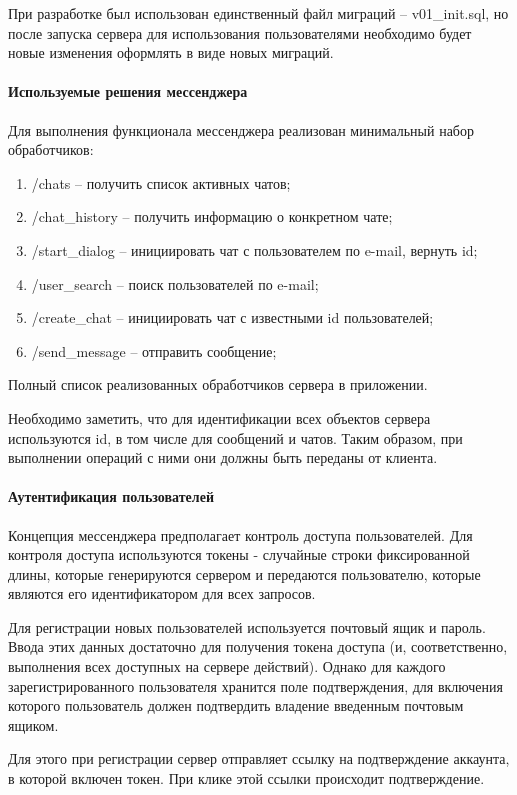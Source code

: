 \documentclass[explnote]{espd}
\begin{document}
При разработке был использован единственный файл миграций -- v01\_init.sql, но после запуска сервера для использования пользователями необходимо будет новые изменения оформлять в виде новых миграций.

\paragraph{Используемые решения мессенджера}
Для выполнения функционала мессенджера реализован минимальный набор обработчиков:

\begin{enumerate}
\item /chats -- получить список активных чатов;
\item /chat\_history -- получить информацию о конкретном чате;
\item /start\_dialog -- инициировать чат с пользователем по e-mail, вернуть id;
\item /user\_search -- поиск пользователей по e-mail;
\item /create\_chat -- инициировать чат с известными id пользователей;
\item /send\_message -- отправить сообщение;
\end{enumerate}

Полный список реализованных обработчиков сервера в приложении.

Необходимо заметить, что для идентификации всех объектов сервера используются id, в том числе для сообщений и чатов. Таким образом, при выполнении операций с ними они должны быть переданы от клиента.

\paragraph{Аутентификация пользователей}
Концепция мессенджера предполагает контроль доступа пользователей. Для контроля доступа используются токены - случайные строки фиксированной длины, которые генерируются сервером и передаются пользователю, которые являются его идентификатором для всех запросов.

Для регистрации новых пользователей используется почтовый ящик и пароль. Ввода этих данных достаточно для получения токена доступа (и, соответственно, выполнения всех доступных на сервере действий). Однако для каждого зарегистрированного пользователя хранится поле подтверждения, для включения которого пользователь должен подтвердить владение введенным почтовым ящиком.

Для этого при регистрации сервер отправляет ссылку на подтверждение аккаунта, в которой включен токен. При клике этой ссылки происходит подтверждение.
\end{document}
